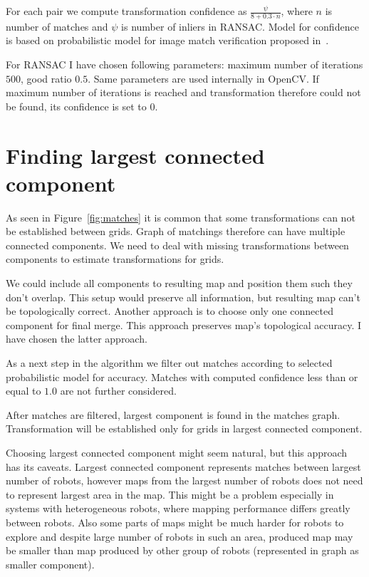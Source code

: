 For each pair we compute transformation confidence as $\frac{\psi}{8 + 0.3 \cdot n}$, where $n$ is number of matches and $\psi$ is number of inliers in \gls{RANSAC}. Model for confidence is based on probabilistic model for image match verification proposed in~\cite{Brown2006}.

For \gls{RANSAC} I have chosen following parameters: maximum number of iterations $500$, good ratio $0.5$. Same parameters are used internally in \gls{OpenCV}. If maximum number of iterations is reached and transformation therefore could not be found, its confidence is set to $0$.


\section{Finding largest connected component} %
\label{sec:findinglargestconnectedcomponent}

As seen in Figure~\ref{fig:matches} it is common that some transformations can not be established between grids. Graph of matchings therefore can have multiple connected components. We need to deal with missing transformations between components to estimate transformations for grids.

We could include all components to resulting map and position them such they don't overlap. This setup would preserve all information, but resulting map can't be topologically correct. Another approach is to choose only one connected component for final merge. This approach preserves map's topological accuracy. I have chosen the latter approach.

As a next step in the algorithm we filter out matches according to selected probabilistic model for accuracy. Matches with computed confidence less than or equal to $1.0$ are not further considered.

After matches are filtered, largest component is found in the matches graph. Transformation will be established only for grids in largest connected component.

Choosing largest connected component might seem natural, but this approach has its caveats. Largest connected component represents matches between largest number of robots, however maps from the largest number of robots does not need to represent largest area in the map. This might be a problem especially in systems with heterogeneous robots, where mapping performance differs greatly between robots. Also some parts of maps might be much harder for robots to explore and despite large number of robots in such an area, produced map may be smaller than map produced by other group of robots (represented in graph as smaller component).

